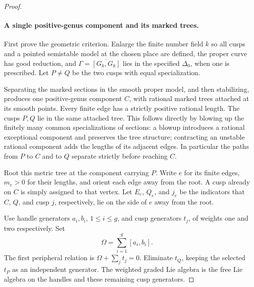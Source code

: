\begin{proof}
\paragraph{A single positive-genus component and its marked trees.}
First prove the geometric criterion. Enlarge the finite number
field \(k\) so all cusps and a pointed semistable model at the
chosen place are defined, the proper curve has good reduction,
and \(\Gamma=\overline{[G_k,G_k]}\) lies in the specified
\(\Delta_0\), when one is prescribed. Let \(P\ne Q\) be
the two cusps with equal specialization.

Separating the marked sections in the smooth proper model,
and then stabilizing, produces one positive-genus component
\(C\), with rational marked trees attached at its smooth
points. Every finite edge has a strictly positive rational
length. The cusps \(P,Q\) lie in the same attached tree.
This follows directly by blowing up the finitely many common
specializations of sections: a blowup introduces a rational
exceptional component and preserves the tree structure;
contracting an unstable rational component adds the lengths
of its adjacent edges. In particular the paths from \(P\)
to \(C\) and to \(Q\) separate strictly before reaching
\(C\).

Root this metric tree at the component carrying \(P\).
Write \(e\) for its finite edges, \(m_e>0\) for their
lengths, and orient each edge away from the root. A cusp
already on \(C\) is simply assigned to that vertex. Let
\(E_e\), \(Q_e\), and \(j_e\) be the indicators that
\(C\), \(Q\), and cusp \(j\), respectively, lie on the
side of \(e\) away from the root.

Use handle generators \(a_i,b_i\), \(1\le i\le g\),
and cusp generators \(t_j\), of weights one and two
respectively. Set
\[
                  \Omega=\sum_{i=1}^g[a_i,b_i].
\]
The first peripheral relation is
\(\Omega+\sum_jt_j=0\). Eliminate \(t_Q\), keeping
the selected \(t_P\) as an independent generator. The
weighted graded Lie algebra is the free Lie algebra on
the handles and these remaining cusp generators.


\end{proof}
